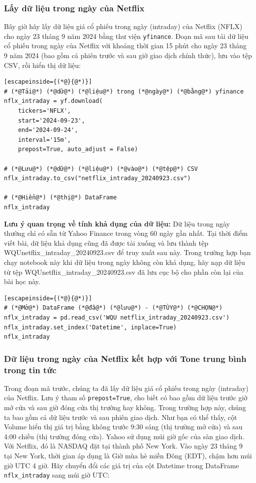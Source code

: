 \subsubsection{Lấy dữ liệu trong ngày của Netflix}

Bây giờ hãy lấy dữ liệu giá cổ phiếu trong ngày (intraday) của Netflix (NFLX) cho ngày 23 tháng 9 năm 2024 bằng thư viện \texttt{yfinance}. Đoạn mã sau tải dữ liệu cổ phiếu trong ngày của Netflix với khoảng thời gian 15 phút cho ngày 23 tháng 9 năm 2024 (bao gồm cả phiên trước và sau giờ giao dịch chính thức), lưu vào tệp CSV, rồi hiển thị dữ liệu:

\begin{lstlisting}[escapeinside={(*@}{@*)}]
# (*@Tải@*) (*@dữ@*) (*@liệu@*) trong (*@ngày@*) (*@bằng@*) yfinance
nflx_intraday = yf.download(
    tickers='NFLX',
    start='2024-09-23',
    end='2024-09-24',
    interval='15m',
    prepost=True, auto_adjust = False)

# (*@Lưu@*) (*@dữ@*) (*@liệu@*) (*@vào@*) (*@tệp@*) CSV
nflx_intraday.to_csv("netflix_intraday_20240923.csv")

# (*@Hiển@*) (*@thị@*) DataFrame
nflx_intraday
\end{lstlisting}

\textbf{Lưu ý quan trọng về tính khả dụng của dữ liệu:} Dữ liệu trong ngày thường chỉ có sẵn từ Yahoo Finance trong vòng 60 ngày gần nhất. Tại thời điểm viết bài, dữ liệu khả dụng cũng đã được tải xuống và lưu thành tệp \textquotesingle WQUnetflix\_intraday\_20240923.csv\textquotesingle{} để truy xuất sau này. Trong trường hợp bạn chạy notebook này khi dữ liệu trong ngày không còn khả dụng, hãy nạp dữ liệu từ tệp \textquotesingle WQUnetflix\_intraday\_20240923.csv\textquotesingle{} đã lưu cục bộ cho phần còn lại của bài học này.

\begin{lstlisting}[escapeinside={(*@}{@*)}]
# (*@Mở@*) DataFrame (*@đã@*) (*@lưu@*) - (*@TÙY@*) (*@CHỌN@*)
nflx_intraday = pd.read_csv('WQU netflix_intraday_20240923.csv')
nflx_intraday.set_index('Datetime', inplace=True)
nflx_intraday
\end{lstlisting}

\subsubsection{Dữ liệu trong ngày của Netflix kết hợp với Tone trung bình trong tin tức}

Trong đoạn mã trước, chúng ta đã lấy dữ liệu giá cổ phiếu trong ngày (intraday) của Netflix. Lưu ý tham số \texttt{prepost=True}, cho biết có bao gồm dữ liệu trước giờ mở cửa và sau giờ đóng cửa thị trường hay không. Trong trường hợp này, chúng ta bao gồm cả dữ liệu trước và sau phiên giao dịch. Như bạn có thể thấy, cột Volume hiển thị giá trị bằng không trước 9:30 sáng (thị trường mở cửa) và sau 4:00 chiều (thị trường đóng cửa). Yahoo sử dụng múi giờ gốc của sàn giao dịch. Với Netflix, đó là NASDAQ đặt tại thành phố New York. Vào ngày 23 tháng 9 tại New York, thời gian áp dụng là Giờ mùa hè miền Đông (EDT), chậm hơn múi giờ UTC 4 giờ. Hãy chuyển đổi các giá trị của cột Datetime trong DataFrame \texttt{nflx\_intraday} sang múi giờ UTC:

